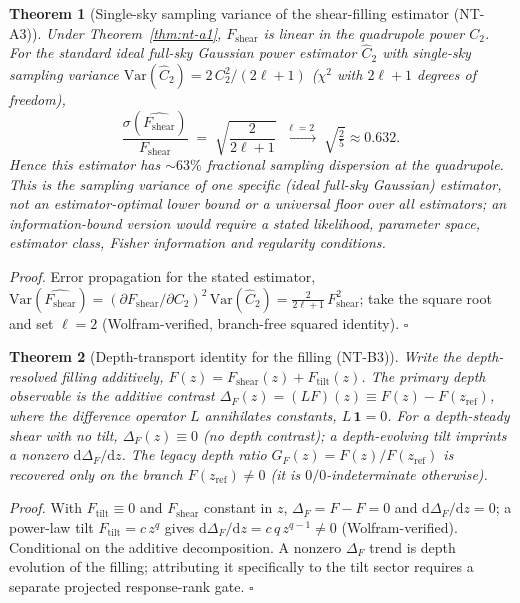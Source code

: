 \documentclass[11pt,a4paper]{article}
\newcommand{\Fshear}{F_{\mathrm{shear}}}
\newcommand{\GF}{G_{F}}
\theoremstyle{plain}
\newtheorem{theorem}{Theorem}
\theoremstyle{definition}
\begin{document}
\begin{theorem}[Single-sky sampling variance of the shear-filling estimator (NT-A3)]
\label{thm:nt-a3}
Under Theorem~\ref{thm:nt-a1}, $\Fshear$ is linear in the quadrupole
power $C_2$. For the standard ideal full-sky Gaussian power estimator
$\hat C_2$ with single-sky sampling variance
$\mathrm{Var}(\hat C_2)=2\,C_2^2/(2\ell+1)$ ($\chi^2$ with $2\ell+1$
degrees of freedom),
\begin{equation}
  \frac{\sigma(\widehat{\Fshear})}{\Fshear}
    \;=\; \sqrt{\frac{2}{2\ell+1}}
    \;\xrightarrow{\ \ell=2\ }\; \sqrt{\tfrac{2}{5}}\approx0.632 .
\end{equation}
Hence this estimator has $\sim63\%$ fractional sampling dispersion at
the quadrupole. This is the sampling variance of one specific (ideal
full-sky Gaussian) estimator, \emph{not} an estimator-optimal lower
bound or a universal floor over all estimators; an information-bound
version would require a stated likelihood, parameter space, estimator
class, Fisher information and regularity conditions.
\end{theorem}

\noindent\emph{Proof.} Error propagation for the stated estimator,
$\mathrm{Var}(\widehat{\Fshear})=(\partial\Fshear/\partial C_2)^2\,
\mathrm{Var}(\hat C_2)=\tfrac{2}{2\ell+1}\,\Fshear^2$; take the square
root and set $\ell=2$ (Wolfram-verified, branch-free squared
identity). $\square$

\begin{theorem}[Depth-transport identity for the filling (NT-B3)]
\label{thm:nt-b3}
Write the depth-resolved filling additively,
$F(z)=\Fshear(z)+F_{\mathrm{tilt}}(z)$. The primary depth observable is
the additive contrast $\Delta_F(z)=(LF)(z)\equiv F(z)-F(z_{\mathrm{ref}})$,
where the difference operator $L$ annihilates constants, $L\,\mathbf{1}=0$.
For a depth-steady shear with no tilt, $\Delta_F(z)\equiv0$ (no depth
contrast); a depth-evolving tilt imprints a nonzero
$\mathrm{d}\Delta_F/\mathrm{d}z$. The legacy depth ratio
$\GF(z)=F(z)/F(z_{\mathrm{ref}})$ is recovered only on the branch
$F(z_{\mathrm{ref}})\neq0$ (it is $0/0$-indeterminate otherwise).
\end{theorem}

\noindent\emph{Proof.} With $F_{\mathrm{tilt}}\equiv0$ and $\Fshear$
constant in $z$, $\Delta_F=F-F=0$ and $\mathrm{d}\Delta_F/\mathrm{d}z=0$;
a power-law tilt $F_{\mathrm{tilt}}=c\,z^{q}$ gives
$\mathrm{d}\Delta_F/\mathrm{d}z=c\,q\,z^{q-1}\neq0$ (Wolfram-verified).
Conditional on the additive decomposition. A nonzero $\Delta_F$ trend is
depth evolution of the filling; attributing it specifically to the tilt
sector requires a separate projected response-rank gate. $\square$
\end{document}
